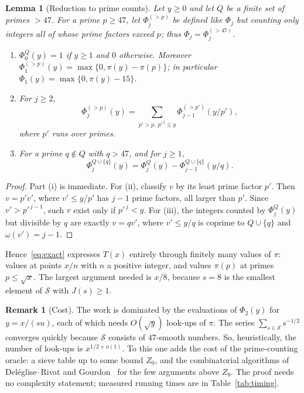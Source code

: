 \documentclass[11pt,a4paper]{article}
\newtheorem{lemma}[theorem]{Lemma}
\theoremstyle{definition}
\newtheorem{remark}[theorem]{Remark}
\newcommand{\cS}{\mathcal S}
\begin{document}
\begin{lemma}[Reduction to prime counts]\label{lem:phirec}
Let $y\ge0$ and let $Q$ be a finite set of primes $>47$. For a prime $p\ge 47$, let $\Phi^{(>p)}_j$ be defined like $\Phi_j$ but counting only integers all of whose prime factors exceed $p$; thus $\Phi_j=\Phi_j^{(>47)}$.
\begin{enumerate}
\item[(i)] $\Phi^{Q}_0(y)=1$ if $y\ge1$ and $0$ otherwise. Moreover $\Phi^{(>p)}_1(y)=\max\{0,\pi(y)-\pi(p)\}$; in particular $\Phi_1(y)=\max\{0,\pi(y)-15\}$.
\item[(ii)] For $j\ge2$,
\[
\Phi^{(>p)}_j(y)=\sum_{p'>p,\ p'^{\,j}\le y}\Phi^{(>p')}_{j-1}(y/p'),
\]
where $p'$ runs over primes.
\item[(iii)] For a prime $q\notin Q$ with $q>47$, and for $j\ge1$,
\[
\Phi^{Q\cup\{q\}}_j(y)=\Phi^{Q}_j(y)-\Phi^{Q\cup\{q\}}_{j-1}(y/q).
\]
\end{enumerate}
\end{lemma}

\begin{proof}
Part (i) is immediate. For (ii), classify $v$ by its least prime factor $p'$. Then $v=p'v'$, where $v'\le y/p'$ has $j-1$ prime factors, all larger than $p'$. Since $v'>p'^{\,j-1}$, such $v$ exist only if $p'^{\,j}<y$. For (iii), the integers counted by $\Phi_j^{Q}(y)$ but divisible by $q$ are exactly $v=qv'$, where $v'\le y/q$ is coprime to $Q\cup\{q\}$ and $\omega(v')=j-1$.
\end{proof}

Hence~\eqref{eq:exact} expresses $T(x)$ entirely through finitely many values of $\pi$: values at points $x/n$ with $n$ a positive integer, and values $\pi(p)$ at primes $p\le\sqrt x$. The largest argument needed is $x/8$, because $s=8$ is the smallest element of $\cS$ with $J(s)\ge1$.

\begin{remark}[Cost]\label{rem:cost}
The work is dominated by the evaluations of $\Phi_2(y)$ for $y=x/(su)$, each of which needs $O(\sqrt y)$ look-ups of $\pi$. The series $\sum_{s\in\cS}s^{-1/2}$ converges quickly because $\cS$ consists of $47$-smooth numbers. So, heuristically, the number of look-ups is $x^{1/2+o(1)}$. To this one adds the cost of the prime-counting oracle: a sieve table up to some bound $Z_0$, and the combinatorial algorithms of Deléglise--Rivat and Gourdon~\cite{DR96,Go01} for the few arguments above $Z_0$. The proof needs no complexity statement; measured running times are in Table~\ref{tab:timing}.
\end{remark}
\end{document}
